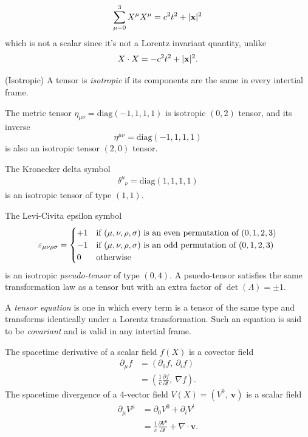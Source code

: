 \documentclass{article}
\newcommand{\glg}{\phantom{\mu}}
\begin{document}
\begin{align*}
	\sum_{\mu = 0}^3 X^\mu X^\mu =  c^2t^2 + |\mathbf{x}|^2
\end{align*}
which is not a scalar since it's not a Lorentz invariant quantity, unlike
\[
  X\cdot X = - c^2t^2 +|\mathbf{x}|^2.
\]
\begin{definition}
	(Isotropic) A tensor is \textit{isotropic} if its components are the same in every intertial frame.
\end{definition}
The metric tensor $ \eta_{\mu\nu} =\mathrm{diag}(-1,1,1,1)$ is isotropic $ (0,2) $ tensor, and its inverse
\[
	\eta^{\mu\nu} = \mathrm{diag}(-1,1,1,1)
\]
is also an isotropic tensor $ (2,0) $ tensor.\par
The Kronecker delta symbol 
\begin{align*}
	\delta^\mu_{\glg \nu} = \mathrm{diag}(1,1,1,1)
\end{align*}
is an isotropic tensor of type $ (1,1) $. \par
The Levi-Civita epsilon symbol
\[
	\varepsilon_{\mu\nu\rho\sigma}=\begin{cases}
	+1 & \text{if}\ (\mu,\nu,\rho,\sigma) \ \text{is an even permutation of} \ (0,1,2,3) \\
-1 & \text{if}\ (\mu,\nu,\rho,\sigma) \ \text{is an odd permutation of} \ (0,1,2,3)\\
0 & \text{otherwise}
	\end{cases}
\]
is an isotropic \textit{pseudo-tensor} of type $ (0,4) $. A psuedo-tensor satisfies the same transformation law as a tensor but with an extra factor of $ \det(\Lambda) = \pm 1 $.\par
A \textit{tensor equation} is one in which every term is a tensor of the same type and transforms identically under a Lorentz transformation. Such an equation is said to be \textit{covariant} and is valid in any intertial frame.
\par
The spacetime derivative of a scalar field $ f(X) $ is a covector field
\begin{align*}
	\partial_\mu f &= (\partial_0 f,\ \partial_i f) \\
		       &= \left(\frac 1c \frac{\partial f}{\partial t}, \ \nabla f \right).
\end{align*}
The spacetime divergence of a 4-vector field $ V(X) = (V^0, \ \mathbf v) $ is a scalar field
\begin{align*}
	\partial_\mu V^\mu &= \partial_0 V^0 + \partial_i V^i\\
			   &= \frac 1c \frac{\partial V^0}{\partial t} + \nabla \cdot\mathbf v.
\end{align*}
\end{document}
